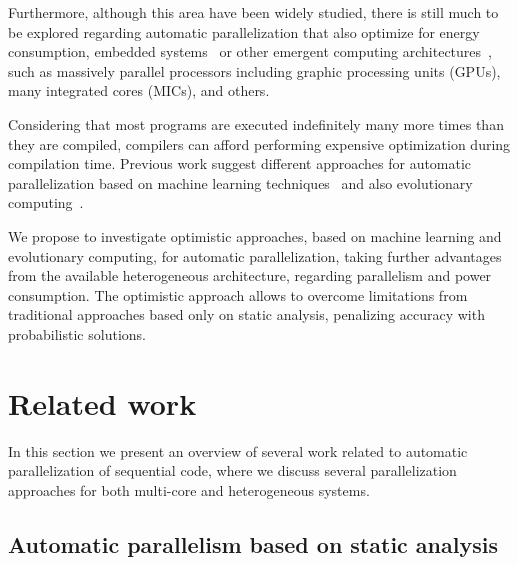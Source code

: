 \documentclass[a4paper,12pt]{article}
\newcommand\FIXME[1]{\textcolor{red}{FIX:}\textcolor{red}{#1}}
\begin{document}
Furthermore, although this area have been widely studied, there is still much
to be explored regarding automatic parallelization that also optimize for
energy consumption, embedded systems~\cite{cordes10} or other emergent
computing architectures~\cite{baskaran10}, such as massively parallel
processors including graphic processing units (GPUs), many integrated cores
(MICs), and others.

Considering that most programs are executed indefinitely many more times than
they are compiled, compilers can afford performing expensive optimization
during compilation time.  Previous work suggest different approaches for
automatic parallelization based on machine learning
techniques~\cite{tournavitis09,wang14a} and also evolutionary
computing~\cite{walsh95,walsh96,williams96,williams99}.

We propose to investigate optimistic approaches, based on machine learning and
evolutionary computing, for automatic parallelization, taking further
advantages from the available heterogeneous architecture, regarding parallelism
and power consumption. The optimistic approach allows to overcome limitations
from traditional approaches based only on static analysis, penalizing accuracy
with probabilistic solutions.   

%

\section{Related work}

In this section we present an overview of several work related to automatic
parallelization of sequential code, where we discuss several parallelization
approaches for both multi-core and heterogeneous systems.

\subsection{Automatic parallelism based on static analysis}
\end{document}
